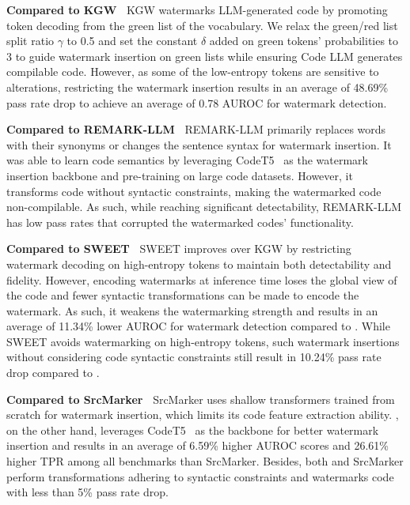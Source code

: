 \textbf{Compared to KGW~\cite{kirchenbauer2023reliability}} KGW watermarks LLM-generated code by promoting token decoding from the green list of the vocabulary. We relax the green/red list split ratio $\gamma$ to 0.5 and set the constant $\delta$ added on green tokens' probabilities to 3 to guide watermark insertion on green lists while ensuring Code LLM generates compilable code. However, as some of the low-entropy tokens are sensitive to alterations, restricting the watermark insertion results in an average of 48.69\% pass rate drop to achieve an average of 0.78 AUROC for watermark detection.

\textbf{Compared to REMARK-LLM~\cite{zhang2024remark}} REMARK-LLM  primarily replaces words with their synonyms or changes the sentence syntax for watermark insertion. It was able to learn code semantics by leveraging CodeT5~\cite{wang2021codet5} as the watermark insertion backbone and pre-training on large code datasets. However, it transforms code without syntactic constraints, making the watermarked code non-compilable. As such, while reaching significant detectability, REMARK-LLM has low pass rates that corrupted the watermarked codes' functionality.

\textbf{Compared to SWEET~\cite{lee2023wrote}} SWEET improves over KGW by restricting watermark decoding on high-entropy tokens to maintain both detectability and fidelity. However, encoding watermarks at inference time loses the global view of the code and fewer syntactic transformations can be made to encode the watermark. As such, it weakens the watermarking strength and results in an average of 11.34\% lower AUROC for watermark detection compared to \sys{}. While SWEET avoids watermarking on high-entropy tokens, such watermark insertions without considering code syntactic constraints still result in 10.24\% pass rate drop compared to \sys{}. 


\textbf{Compared to SrcMarker~\cite{yang2023towards}} SrcMarker uses shallow transformers trained from scratch for watermark insertion, which limits its code feature extraction ability.  
\sys{}, on the other hand, leverages CodeT5~\cite{wang2021codet5} as the backbone for better watermark insertion and results in an average of 6.59\% higher AUROC scores and 26.61\% higher TPR among all benchmarks than SrcMarker. Besides, both \sys{} and SrcMarker perform transformations adhering to syntactic constraints and watermarks code with less than 5\% pass rate drop. 


